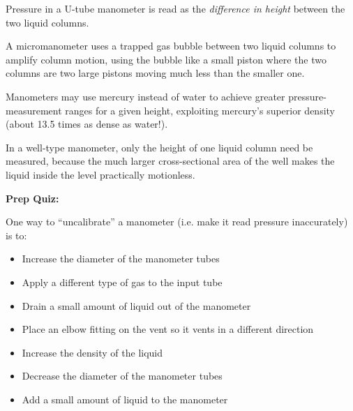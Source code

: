 Pressure in a U-tube manometer is read as the {\it difference in height} between the two liquid columns.

\vskip 10pt

A micromanometer uses a trapped gas bubble between two liquid columns to amplify column motion, using the bubble like a small piston where the two columns are two large pistons moving much less than the smaller one.

\vskip 10pt

Manometers may use mercury instead of water to achieve greater pressure-measurement ranges for a given height, exploiting mercury's superior density (about 13.5 times as dense as water!).

\vskip 10pt

In a well-type manometer, only the height of one liquid column need be measured, because the much larger cross-sectional area of the well makes the liquid inside the level practically motionless.















\vfil \eject

\noindent
{\bf Prep Quiz:}

One way to ``uncalibrate'' a manometer (i.e. make it read pressure inaccurately) is to:

\begin{itemize}
\item{} Increase the diameter of the manometer tubes
\vskip 5pt 
\item{} Apply a different type of gas to the input tube
\vskip 5pt 
\item{} Drain a small amount of liquid out of the manometer
\vskip 5pt 
\item{} Place an elbow fitting on the vent so it vents in a different direction
\vskip 5pt 
\item{} Increase the density of the liquid
\vskip 5pt 
\item{} Decrease the diameter of the manometer tubes
\vskip 5pt 
\item{} Add a small amount of liquid to the manometer
\end{itemize}





